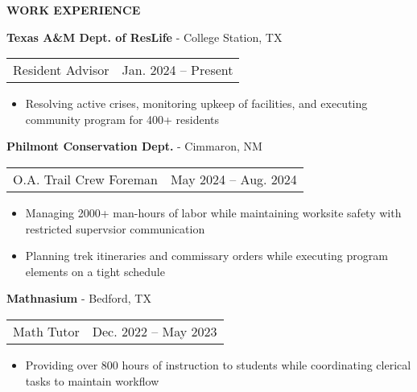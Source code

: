\documentclass[18pt]{article}
\begin{document}


\begin{center}
    \textbf{WORK EXPERIENCE}
    \hrulefill
\end{center}
\vspace{-0.5\baselineskip}

\textbf{Texas A\&M Dept. of ResLife} - College Station, TX

\begin{tabular}{p{} p{}}
    Resident Advisor & \hfill Jan. 2024 – Present
\end{tabular}

\vspace{-0.5\baselineskip}
\begin{itemize}[noitemsep]
  \item Resolving active crises, monitoring upkeep of facilities, and executing community program for 400+ residents
\end{itemize}

\vspace{-0.5\baselineskip}
\textbf{Philmont Conservation Dept.} - Cimmaron, NM 

\begin{tabular}{p{} p{}}
    O.A. Trail Crew Foreman & \hfill May 2024 – Aug. 2024
\end{tabular}

\vspace{-0.5\baselineskip}
\begin{itemize}[noitemsep]
  \item Managing 2000+ man-hours of labor while maintaining worksite safety with restricted supervsior communication
  \item Planning trek itineraries and commissary orders while executing program elements on a tight schedule
\end{itemize}

\vspace{-0.5\baselineskip}
\textbf{Mathnasium} - Bedford, TX 

\begin{tabular}{p{} p{}}
  Math Tutor & \hfill Dec. 2022 – May 2023 
\end{tabular}


\vspace{-0.5\baselineskip}
\begin{itemize}[noitemsep]
  \item Providing over 800 hours of instruction to students while coordinating clerical tasks to maintain workflow
\end{itemize}
\end{document}
